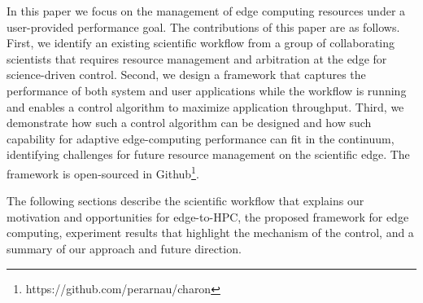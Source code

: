 In this paper we focus on the management of edge computing resources under a user-provided performance goal. The contributions of this paper are as follows. First, we identify an existing scientific workflow from a group of collaborating scientists that requires resource management and arbitration at the edge for science-driven control. Second, we design a framework that captures the performance of both system and user applications while the workflow is running and enables a control algorithm to maximize application throughput. Third, we demonstrate how such a control algorithm can be designed and how such capability for adaptive edge-computing performance can fit in the continuum, identifying challenges for future resource management on the scientific edge. The framework is open-sourced in Github\footnote{https://github.com/perarnau/charon}.

The following sections describe the scientific workflow that explains our motivation and opportunities for edge-to-HPC, the proposed framework for edge computing, experiment results that highlight the mechanism of the control, and a summary of our approach and future direction.